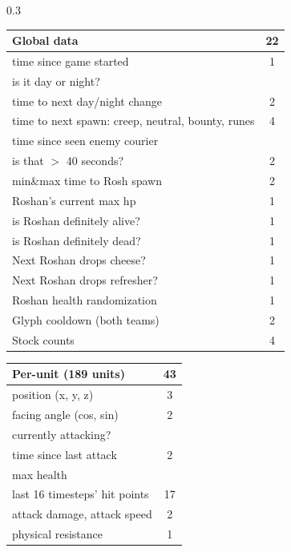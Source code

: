 \documentclass[ocean-paper.tex]{subfiles}
\begin{document}
\begin{table}
\begin{scriptsize}
\begin{threeparttable}
\begin{subtable}[t]{0.3\textwidth}
\begin{tabular}[t]{|p{4cm}|c|}
  \hline
  \textbf{Global data}   & \textbf{22}\\\hline
  time since game started & 1 \\\hline
  is it day or night? &  \\
  time to next day/night change & 2 \\\hline
  time to next spawn: creep, neutral, bounty, runes & 4 \\\hline
  time since seen enemy courier &  \\
  is that $>$ 40 seconds?\tnote{a} & 2 \\\hline
  min\&max time to Rosh spawn & 2 \\\hline
  Roshan's current max hp & 1 \\\hline
  is Roshan definitely alive? & 1 \\\hline
  is Roshan definitely dead? & 1 \\\hline
  Next Roshan drops cheese? & 1 \\\hline
  Next Roshan drops refresher? & 1 \\\hline
  Roshan health randomization\tnote{b} & 1 \\\hline
  Glyph cooldown (both teams) & 2 \\\hline
  Stock counts\tnote{c} & 4 \\\hline
\end{tabular}
\begin{tabular}{|p{4cm}|c|}
  \hline
  \textbf{Per-unit (189 units)}   &  \textbf{43}\\\hline
  position (x, y, z) & 3 \\\hline
  facing angle (cos, sin) & 2 \\\hline
  currently attacking?\tnote{e} & \\
  time since last attack\tnote{d} & 2 \\\hline
  max health & \\
  last 16 timesteps' hit points & 17 \\\hline
  attack damage, attack speed & 2 \\\hline
  physical resistance & 1 \\\hline

\end{tabular}
\end{subtable}
\end{threeparttable}
\end{scriptsize}
\end{table}
\end{document}
